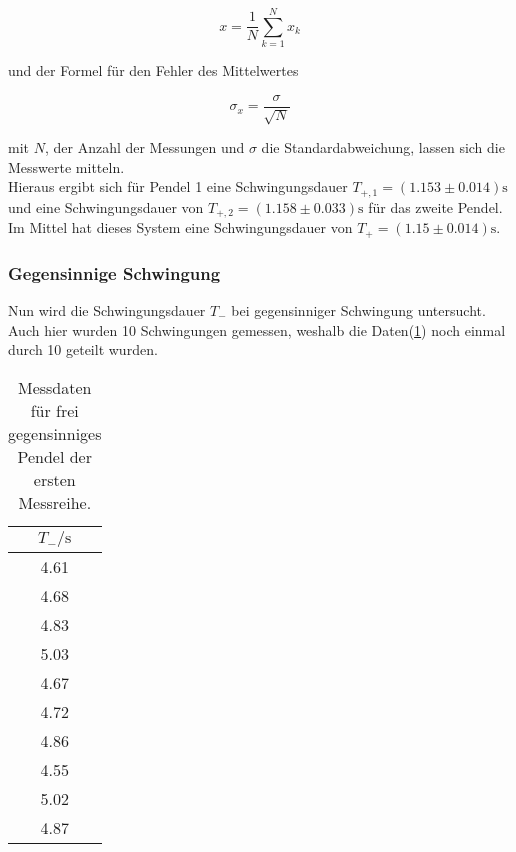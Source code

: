             \begin{equation}
                x = \frac{1}{N} \sum_{k=1}^{N} x_k
                \label{eqn:mittel}
            \end{equation}

            \noindent und der Formel für den Fehler des Mittelwertes

            \begin{equation}
                \sigma_{x} = \frac{\sigma}{\sqrt{N}}
                \label{eqn:mif}
            \end{equation}

            \noindent mit $N$, der Anzahl der Messungen und $\sigma$ die Standardabweichung, lassen sich die Messwerte mitteln.\\
            Hieraus ergibt sich für Pendel 1 eine 
            Schwingungsdauer $T_{+,1} = (1.153 \pm 0.014) \si{\second}$ und eine Schwingungsdauer von 
            $T_{+,2} = (1.158 \pm 0.033) \si{\second}$ für das zweite Pendel. Im Mittel hat dieses System eine Schwingungsdauer von 
            $T_+ = (1.15 \pm 0.014) \si{\second}$.

        \subsubsection{Gegensinnige Schwingung}
            
            \noindent Nun wird die Schwingungsdauer $T_{-}$ bei gegensinniger Schwingung untersucht. Auch hier wurden 10 Schwingungen gemessen, 
            weshalb die Daten(\ref{tab:geg1}) noch einmal durch 10 geteilt wurden.

            \begin{table}[ht]
                \centering
                \caption{Messdaten für frei gegensinniges Pendel der ersten Messreihe.}
                \label{tab:geg1}
                \begin{tabular}{c }
                 \toprule
                 $T_- / \si{\s}$ \\
                 \midrule
                 4.61  \\ 
                 4.68  \\ 
                 4.83  \\ 
                 5.03  \\ 
                 4.67  \\ 
                 4.72  \\ 
                 4.86  \\ 
                 4.55  \\ 
                 5.02  \\ 
                 4.87  \\ 
                \end{tabular}
            \end{table}

